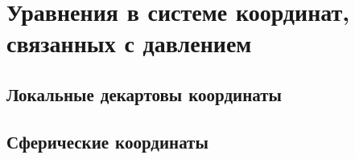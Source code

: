 \chapter{Уравнения в системе координат, связанных с давлением}
    \lipsum[1-2]

\section{Локальные декартовы координаты}
    \lipsum[1-2]

\section{Сферические координаты}
    \lipsum[1-2]





